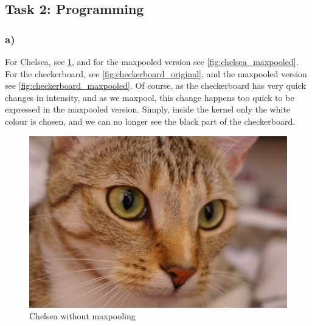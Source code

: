 \newpage
\subsection{Task 2: Programming}


\subsubsection*{a)}
For Chelsea, see \cref{fig:chelsea_original}, and for the maxpooled version see \cref{fig:chelsea_maxpooled}. For the checkerboard, see \cref{fig:checkerboard_original}, and the maxpooled version see \cref{fig:checkerboard_maxpooled}. Of course, as the checkerboard has very quick changes in intensity, and as we maxpool, this change happens too quick to be expressed in the maxpooled version. Simply, inside the kernel only the white colour is chosen, and we can no longer see the black part of the checkerboard. 

\begin{figure}[]
    \centering
    \includegraphics[width=1.00\textwidth]{figures/image_processed/chelsea.png}
    \caption{Chelsea without maxpooling}
    \label{fig:chelsea_original}
\end{figure}

